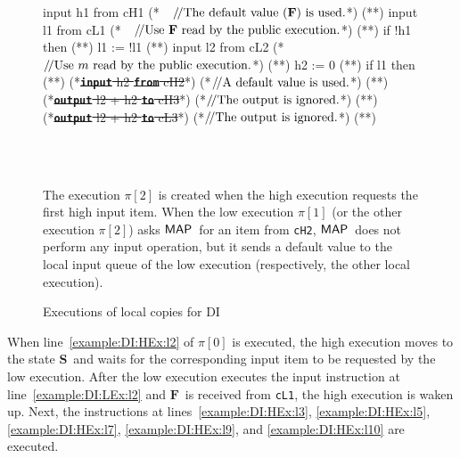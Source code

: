 \documentclass[10pt,a4paper,oneside]{article}
\def\sS{\textbf{S}}
\def\VFALSE{\ensuremath{\textbf{F}}}
\def\sanserif#1{\ensuremath{\sf #1}}
\def\MAP{\ensuremath{\sanserif{MAP}}}
\def\Prog{\ensuremath{\pi}}
\def\Progl#1{\ensuremath{\Prog[#1]}}
\def\ctab{}
\def\icomment#1{\ensuremath{\ctab/\!/\textnormal{#1}}}
\def\figdesc#1{
\noindent
\centering
\begin{minipage}{0.95\columnwidth}
\vspace{3pt}
\begin{footnotesize}
#1
\end{footnotesize}
\end{minipage}
}
\def\linecode#1{{\texttt{#1}}}
\def\linecodeb#1{{\texttt{\bfseries #1}}}
\begin{document}
\begin{figure}[!t]
\subfloat[The low execution \Progl{1}]{\label{fig:example:DI:execution:L}\usebox{\mylistingbox}}\begin{lrbox}{\mylistingbox}\begin{minipage}{\columnwidth}\begin{javascript}
input h1 from cH1 (*~~\icomment{The default value (\VFALSE) is used.}*) (*\label{example:DI:UEx:l1}*)
input l1 from cL1 (*~~\icomment{Use \VFALSE\ read by the public execution.}*) (*\label{example:DI:UEx:l2}*)
if !h1 then      (*\label{example:DI:UEx:l3}*)
    l1 := !l1    (*\label{example:DI:UEx:l4}*)
input l2 from cL2 (*~~\icomment{Use $m$ read by the public execution.}*) (*\label{example:DI:UEx:l5}*)
h2 := 0           (*\label{example:DI:UEx:l6}*)
if l1 then        (*\label{example:DI:UEx:l7}*)
    (*\sout{\linecodeb{input} h2 \linecodeb{from} cH2}*) (*\icomment{A default value is used.}*) (*\label{example:DI:UEx:l8}*)
(*\sout{\linecodeb{output} l2 + h2 \linecodeb{to} cH3}*) (*\icomment{The output is ignored.}*) (*\label{example:DI:UEx:l9}*)    
(*\sout{\linecodeb{output} l2 + h2 \linecodeb{to} cL3}*) (*\icomment{The output is ignored.}*) (*\label{example:DI:UEx:l10}*)  
\end{javascript}\end{minipage}\end{lrbox}  \\
\subfloat[The other execution \Progl{2}]{\label{fig:example:DI:execution:U}\usebox{\mylistingbox}}
\\
\figdesc{The execution \Progl{2} is created when the high execution requests the first high input item. When the low execution \Progl{1} (or the other execution \Progl{2}) asks \MAP\ for an item from \linecode{cH2}, \MAP\ does not perform any input operation, but it sends a default value to the local input queue of the low execution (respectively, the other local execution). }
\caption{Executions of local copies for DI}
\label{fig:example:execution:DI:HLUEx}
\end{figure}


When line~\ref{example:DI:HEx:l2} of \Progl{0} is executed, the high execution moves to the state \sS\ and waits for the corresponding input item to be requested by the low execution. After the low execution executes the input instruction at line~\ref{example:DI:LEx:l2} and \VFALSE\ is received from \linecode{cL1}, the high execution is waken up. Next, the instructions at lines~\ref{example:DI:HEx:l3}, \ref{example:DI:HEx:l5}, \ref{example:DI:HEx:l7}, \ref{example:DI:HEx:l9}, and \ref{example:DI:HEx:l10} are executed.
\end{document}

